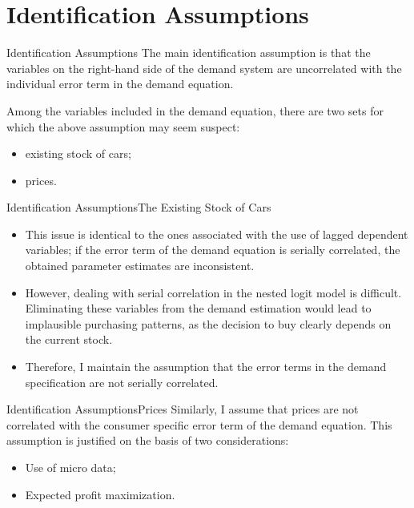 \documentclass{beamer}
\begin{document}
\section{Identification Assumptions}
\begin{frame}[shrink]
	\transfade %
	\tableofcontents[sectionstyle=show/shaded,subsectionstyle=show/shaded/hide]
	\addtocounter{framenumber}{-1}
\end{frame}
\begin{frame}{Identification Assumptions}
	The main identification assumption is that the variables on the right-hand side of the demand system are uncorrelated with the individual error term in the demand equation.
	
	Among the variables included in the demand equation, there are two sets for which the above assumption may seem suspect:
	\begin{itemize}
		\item existing stock of cars;
		\item prices.
	\end{itemize}
\end{frame}
\begin{frame}{Identification Assumptions}{The Existing Stock of Cars}
	\begin{itemize}
		\item This issue is identical to the ones associated with the use of lagged dependent variables; if the error term of the demand equation is serially correlated, the obtained parameter estimates are inconsistent.
		\item However, dealing with serial correlation in the nested logit model is difficult. Eliminating these variables from the demand estimation would lead to implausible purchasing patterns, as the decision to buy clearly depends on the current stock.
		\item Therefore, I maintain the assumption that the error terms in the demand specification are not serially correlated.
	\end{itemize}
\end{frame}
\begin{frame}{Identification Assumptions}{Prices}
	Similarly, I assume that prices are not correlated with the consumer specific error term of the demand equation. This assumption is justified on the basis of two considerations:
	\begin{itemize}
		\item Use of micro data;
		\item Expected profit maximization.
	\end{itemize}
\end{frame}
\end{document}
